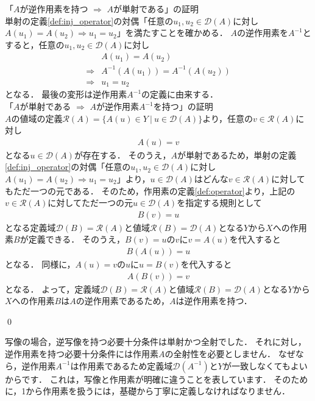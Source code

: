 \begin{Proof}
「$A$が逆作用素を持つ $\Rightarrow$ $A$が単射である」の証明\\
単射の定義\ref{def:inj_operator}の対偶「任意の$u_1, u_2 \in {\mathcal D}(A)$に対し$A (u_1) = A (u_2) \Rightarrow u_1 = u_2$」を満たすことを確かめる．
$A$の逆作用素を$A^{-1}$とすると，任意の$u_1, u_2 \in {\mathcal D}(A)$に対し
\begin{align*}
 & A (u_1) = A (u_2) \\
 \Rightarrow& A^{-1} (A ( u_1 ) ) = A^{-1} (A (u_2)) \\
 \Rightarrow& u_1 = u_2
\end{align*}
となる．
最後の変形は逆作用素$A^{-1}$の定義に由来する．\\


\noindent 「$A$が単射である $\Rightarrow$ $A$が逆作用素$A^{-1}$を持つ」の証明\\
$A$の値域の定義${\mathcal R}(A)=\{ A(u) \in Y ~ | ~ u \in {\mathcal D}(A) \}$より，任意の$v \in {\mathcal R}(A)$に対し
\begin{align*}
  A(u) = v
\end{align*}
となる$u \in {\mathcal D}(A)$が存在する．
そのうえ，$A$が単射であるため，単射の定義\ref{def:inj_operator}の対偶「任意の$u_1, u_2 \in {\mathcal D}(A)$に対し$A (u_1) = A (u_2) \Rightarrow u_1 = u_2$」より，$u \in {\mathcal D}(A)$はどんな$v \in {\mathcal R}(A)$に対してもただ一つの元である．
そのため，作用素の定義\ref{def:operator}より，上記の$v \in {\mathcal R}(A)$に対してただ一つの元$u \in {\mathcal D}(A)$を指定する規則として
\begin{align*}
  B(v) = u
\end{align*}
となる定義域${\mathcal D}(B) = {\mathcal R}(A)$と値域${\mathcal R}(B)={\mathcal D}(A)$となる$Y$から$X$への作用素$B$が定義できる．
そのうえ，$B(v) = u$の$v$に$v = A(u)$を代入すると
\begin{align*}
  B(A(u)) = u
\end{align*}
となる．
同様に，$A(u) = v$の$u$に$u = B(v)$を代入すると
\begin{align*}
  A( B(v) ) = v
\end{align*}
となる．
よって，定義域${\mathcal D}(B) = {\mathcal R}(A)$と値域${\mathcal R}(B)={\mathcal D}(A)$となる$Y$から$X$への作用素$B$は$A$の逆作用素であるため，$A$は逆作用素を持つ．

\qed
\end{Proof}

写像の場合，逆写像を持つ必要十分条件は単射かつ全射でした．
それに対し，逆作用素を持つ必要十分条件には作用素$A$の全射性を必要としません．
なぜなら，逆作用素$A^{-1}$は作用素であるため定義域${\mathcal D}(A^{-1})$と$Y$が一致しなくてもよいからです．
これは，写像と作用素が明確に違うことを表しています．
そのために，1から作用素を扱うには，基礎から丁寧に定義しなければなりません．

